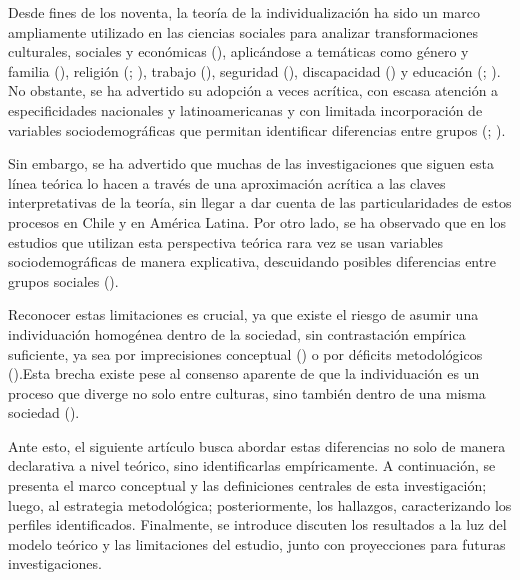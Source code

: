 \documentclass[
  letterpaper,
  DIV=11,
  numbers=noendperiod]{scrartcl}
\begin{document}
Desde fines de los noventa, la teoría de la individualización ha sido un
marco ampliamente utilizado en las ciencias sociales para analizar
transformaciones culturales, sociales y económicas
(), aplicándose a temáticas como
género y familia (),
religión (;
), trabajo
(), seguridad
(), discapacidad
()
y educación
(;
). No obstante, se ha
advertido su adopción a veces acrítica, con escasa atención a
especificidades nacionales y latinoamericanas y con limitada
incorporación de variables sociodemográficas que permitan identificar
diferencias entre grupos (;
).

Sin embargo, se ha advertido que muchas de las investigaciones que
siguen esta línea teórica lo hacen a través de una aproximación acrítica
a las claves interpretativas de la teoría, sin llegar a dar cuenta de
las particularidades de estos procesos en Chile y en América Latina. Por
otro lado, se ha observado que en los estudios que utilizan esta
perspectiva teórica rara vez se usan variables sociodemográficas de
manera explicativa, descuidando posibles diferencias entre grupos
sociales ().

Reconocer estas limitaciones es crucial, ya que existe el riesgo de
asumir una individuación homogénea dentro de la sociedad, sin
contrastación empírica suficiente, ya sea por imprecisiones conceptual
() o por déficits metodológicos
().Esta brecha existe pese al
consenso aparente de que la individuación es un proceso que diverge no
solo entre culturas, sino también dentro de una misma sociedad
().

Ante esto, el siguiente artículo busca abordar estas diferencias no solo
de manera declarativa a nivel teórico, sino identificarlas
empíricamente. A continuación, se presenta el marco conceptual y las
definiciones centrales de esta investigación; luego, al estrategia
metodológica; posteriormente, los hallazgos, caracterizando los perfiles
identificados. Finalmente, se introduce discuten los resultados a la luz
del modelo teórico y las limitaciones del estudio, junto con
proyecciones para futuras investigaciones.
\end{document}
